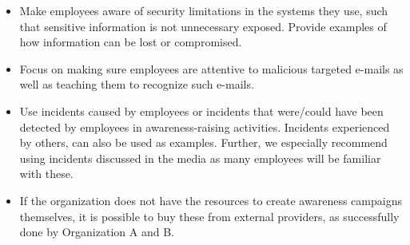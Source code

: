 \begin{itemize}
\begin{itemize}
\item Make employees aware of security limitations in the systems they use, such that sensitive information is not unnecessary exposed. Provide examples of how information can be lost or compromised.
\item Focus on making sure employees are attentive to malicious targeted e-mails as well as teaching them to recognize such e-mails.
\item Use incidents caused by employees or incidents that were/could have been detected by employees in awareness-raising activities. Incidents experienced by others, can also be used as examples. Further, we especially recommend using incidents discussed in the media as many employees will be familiar with these. 
\item If the organization does not have the resources to create awareness campaigns themselves, it is possible to buy these from external providers, as successfully done by Organization A and B.
\end{itemize}
\end{itemize}